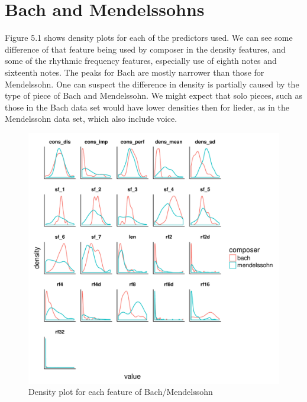 \documentclass[12pt,twoside]{reedthesis}
\theoremstyle{definition}
\theoremstyle{definition}
\theoremstyle{definition}
\theoremstyle{remark}
\begin{document}
\section{Bach and Mendelssohns}\label{bach-and-mendelssohns}

Figure 5.1 shows density plots for each of the predictors used. We can
see some difference of that feature being used by composer in the
density features, and some of the rhythmic frequency features,
especially use of eighth notes and sixteenth notes. The peaks for Bach
are mostly narrower than those for Mendelssohn. One can suspect the
difference in density is partially caused by the type of piece of Bach
and Mendelssohn. We might expect that solo pieces, such as those in the
Bach data set would have lower densities then for lieder, as in the
Mendelssohn data set, which also include voice.
\begin{figure}[H]
\centering
\includegraphics[scale = .6]{images/distribution_b.pdf}
\caption{Density plot for each feature of Bach/Mendelssohn}
\label{subd}
\end{figure}
\end{document}
